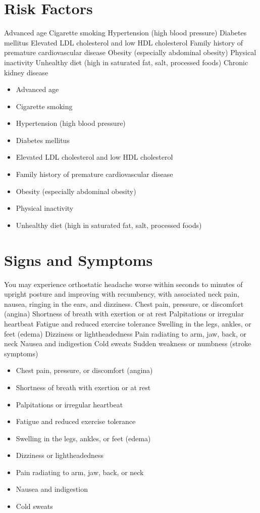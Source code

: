 \section{Risk Factors}
Advanced age Cigarette smoking Hypertension (high blood pressure) Diabetes mellitus Elevated LDL cholesterol and low HDL cholesterol Family history of premature cardiovascular disease Obesity (especially abdominal obesity) Physical inactivity Unhealthy diet (high in saturated fat, salt, processed foods) Chronic kidney disease

\begin{itemize}[noitemsep]
  \item Advanced age
  \item Cigarette smoking
  \item Hypertension (high blood pressure)
  \item Diabetes mellitus
  \item Elevated LDL cholesterol and low HDL cholesterol
  \item Family history of premature cardiovascular disease
  \item Obesity (especially abdominal obesity)
  \item Physical inactivity
  \item Unhealthy diet (high in saturated fat, salt, processed foods)
\end{itemize}
\section{Signs and Symptoms}
You may experience orthostatic headache worse within seconds to minutes of upright posture and improving with recumbency, with associated neck pain, nausea, ringing in the ears, and dizziness. Chest pain, pressure, or discomfort (angina) Shortness of breath with exertion or at rest Palpitations or irregular heartbeat Fatigue and reduced exercise tolerance Swelling in the legs, ankles, or feet (edema) Dizziness or lightheadedness Pain radiating to arm, jaw, back, or neck Nausea and indigestion Cold sweats Sudden weakness or numbness (stroke symptoms)

\begin{itemize}[noitemsep]
  \item Chest pain, pressure, or discomfort (angina)
  \item Shortness of breath with exertion or at rest
  \item Palpitations or irregular heartbeat
  \item Fatigue and reduced exercise tolerance
  \item Swelling in the legs, ankles, or feet (edema)
  \item Dizziness or lightheadedness
  \item Pain radiating to arm, jaw, back, or neck
  \item Nausea and indigestion
  \item Cold sweats
\end{itemize}

